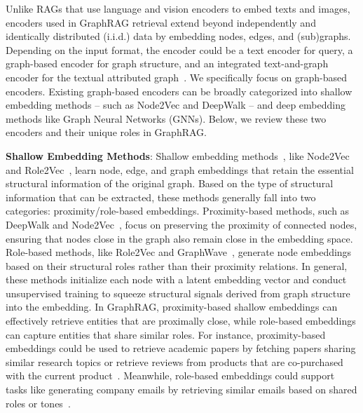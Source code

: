 Unlike RAGs that use language and vision encoders to embed texts and images, encoders used in GraphRAG retrieval extend beyond independently and identically distributed (i.i.d.) data by embedding nodes, edges, and (sub)graphs. Depending on the input format, the encoder could be a text encoder for query, a graph-based encoder for graph structure, and an integrated text-and-graph encoder for the textual attributed graph~\cite{chen2023label, chen2024exploring}. We specifically focus on graph-based encoders. Existing graph-based encoders can be broadly categorized into shallow embedding methods -- such as Node2Vec and DeepWalk -- and deep embedding methods like Graph Neural Networks (GNNs). Below, we review these two encoders and their unique roles in GraphRAG. 


\textbf{Shallow Embedding Methods}:  
Shallow embedding methods~\cite{fey2019fast}, like Node2Vec~\cite{grover2016node2vec} and Role2Vec~\cite{ahmed2018learning}, learn node, edge, and graph embeddings that retain the essential structural information of the original graph. Based on the type of structural information that can be extracted, these methods generally fall into two categories: proximity/role-based embeddings. Proximity-based methods, such as DeepWalk and Node2Vec~\cite{grover2016node2vec, perozzi2014deepwalk}, focus on preserving the proximity of connected nodes, ensuring that nodes close in the graph also remain close in the embedding space. Role-based methods, like Role2Vec and GraphWave~\cite{ahmed2018learning, donnat2018learning}, generate node embeddings based on their structural roles rather than their proximity relations. In general, these methods initialize each node with a latent embedding vector and conduct unsupervised training to squeeze structural signals derived from graph structure into the embedding. In GraphRAG, proximity-based shallow embeddings can effectively retrieve entities that are proximally close, while role-based embeddings can capture entities that share similar roles. For instance, proximity-based embeddings could be used to retrieve academic papers by fetching papers sharing similar research topics or retrieve reviews from products that are co-purchased with the current product~\cite{salemi2023lamp, wang2024augmenting}. Meanwhile, role-based embeddings could support tasks like generating company emails by retrieving similar emails based on shared roles or tones~\cite{wang2024augmenting}.



